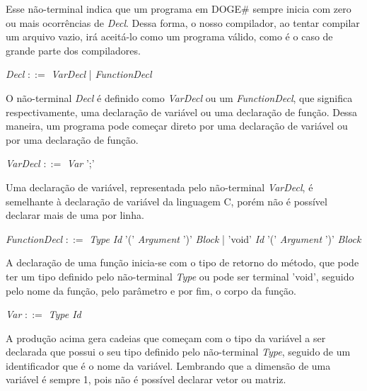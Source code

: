 \documentclass{scrreprt}
\begin{document}
\par Esse não-terminal indica que um programa em DOGE\# sempre inicia com zero ou mais ocorrências de \textit{Decl}. Dessa forma, o nosso compilador, ao tentar compilar um arquivo vazio, irá aceitá-lo como um programa válido, como é o caso de grande parte dos compiladores.

\begin{center}
\textit{Decl }$::=$\textit{ VarDecl} | \textit {FunctionDecl}
\end{center}

\par O não-terminal \textit{Decl} é definido como \textit{VarDecl} ou um \textit{FunctionDecl}, que significa respectivamente, uma declaração de variável ou uma declaração de função. Dessa maneira, um programa pode começar direto por uma declaração de variável ou por uma declaração de função.

\begin{center}
\textit{VarDecl }$::=$ \textit{Var} ';'
\end{center}

\par Uma declaração de variável, representada pelo não-terminal \textit{VarDecl}, é semelhante à declaração de variável da linguagem C, porém não é possível declarar mais de uma por linha.

\begin{center}
\textit{FunctionDecl }$::=$ \textit{Type} \textit{Id } '('\textit{ Argument }')'\textit{ Block} \newline |  'void' \textit{Id } '('\textit{ Argument }')'\textit{ Block} 
\end{center}

\par A declaração de uma função inicia-se com o tipo de retorno do método, que pode ter um tipo definido pelo não-terminal \textit{Type} ou pode ser terminal 'void', seguido pelo nome da função, pelo parâmetro e por fim, o corpo da função. 

\begin{center}
\textit{Var }$::=$\textit{ Type Id}
\end{center}

\par A produção acima gera cadeias que começam com o tipo da variável a ser declarada que possui o seu tipo definido pelo não-terminal \textit{Type}, seguido de um identificador que é o nome da variável. Lembrando que a dimensão de uma variável é sempre 1, pois não é possível declarar vetor ou matriz. 
\end{document}
